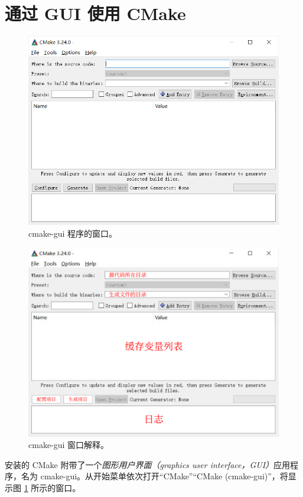 
\section{通过 GUI 使用 CMake}

\begin{figure}[p]
	\centering
	\includegraphics[width=0.75\linewidth]{assets/cmake-gui-1}
	\caption{cmake-gui 程序的窗口。}
	\label{fig:cmake-gui-1}
\end{figure}

\begin{figure}[p]
	\centering
	\includegraphics[width=0.75\linewidth]{assets/cmake-gui-2}
	\caption{cmake-gui 窗口解释。}
	\label{fig:cmake-gui-2}
\end{figure}

安装的 CMake 附带了一个\emph{图形用户界面（graphics user interface，GUI）}应用程序，名为 cmake-gui。从开始菜单依次打开“CMake”“CMake (cmake-gui)”，将显示图 \ref{fig:cmake-gui-1} 所示的窗口。

